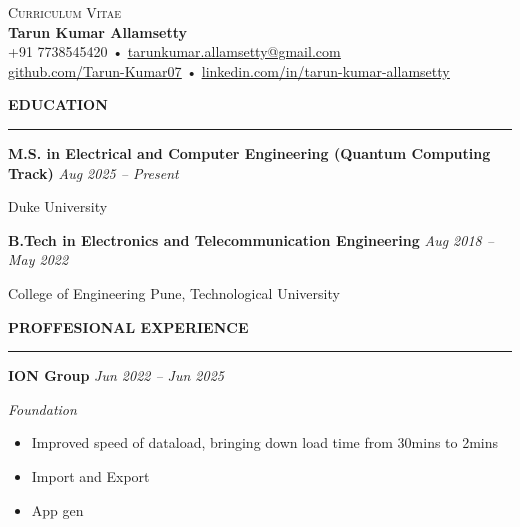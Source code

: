 \documentclass[a4paper,10pt]{article}
\let\oldhref\href
\renewcommand{\href}[2]{\oldhref{#1}{\uline{#2}}}
\newcommand{\cvHeaderOne}[1]{%
  \vspace*{1.5em}%
  {\noindent\large\textbf{\MakeUppercase{#1}}\par}%
  \noindent\rule{\linewidth}{0.4pt}%
  \vspace*{0.5em}%
}
\newcommand{\cvHeaderTwo}[2]{%
  \vspace{0.8em}%
  \noindent\textbf{\normalsize #1} \hfill \textit{#2}\par%
}
\newcommand{\cvHeaderThree}[1]{%
  \noindent\textit{#1}%
}
\newcommand{\cvItem}[1]{%
  \noindent\parbox{\dimexpr\linewidth}{#1}\par%
}
\newenvironment{cvItemList}{%
  \begin{itemize}%
    \setlength{\itemsep}{0.1em}%
    \setlength{\topsep}{0em}%
    \setlength{\partopsep}{0em}%
    \setlength{\parsep}{0em}%
    \setlength{\parskip}{0em}%
}{%
  \end{itemize}%
}
\begin{document}
\begin{center}
  {\large \textsc{Curriculum Vitae}} \\[0.3em]
  {\LARGE \textbf{Tarun Kumar Allamsetty}} \\[0.75em]
  \small
  +91 7738545420 \quad • \quad \href{mailto:tarunkumar.allamsetty@gmail.com}{tarunkumar.allamsetty@gmail.com} \\[0.2em]
  \href{https://github.com/Tarun-Kumar07}{github.com/Tarun-Kumar07} \quad • \quad
  \href{https://www.linkedin.com/in/tarun-kumar-allamsetty}{linkedin.com/in/tarun-kumar-allamsetty}
\end{center}

\vspace{2em}

\cvHeaderOne{Education}

\cvHeaderTwo{M.S. in Electrical and Computer Engineering (Quantum Computing Track)}{Aug 2025 -- Present}
\cvItem{Duke University}

\cvHeaderTwo{B.Tech in Electronics and Telecommunication Engineering}{Aug 2018 -- May 2022}
\cvItem{College of Engineering Pune, Technological University}


\cvHeaderOne{Proffesional Experience}

\cvHeaderTwo{ION Group}{Jun 2022 -- Jun 2025}

\cvHeaderThree{Foundation}

\begin{cvItemList}
  \item Improved speed of dataload, bringing down load time from 30mins to 2mins  
  \item Import and Export 
  \item App gen 
\end{cvItemList}
\end{document}
